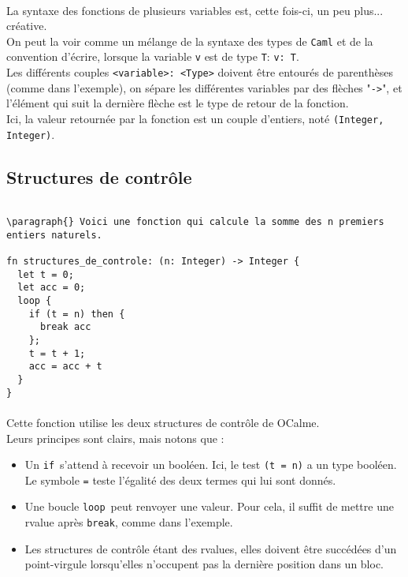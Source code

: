 \documentclass[french]{article}
\begin{document}
\paragraph{} La syntaxe des fonctions de plusieurs variables est,
cette fois-ci, un peu plus... créative. \\
On peut la voir comme un mélange de la syntaxe des types de \verb|Caml|
et de la convention d'écrire, lorsque la variable \verb|v| est de type
\verb|T|: \verb|v: T|. \\
Les différents couples \verb|<variable>: <Type>| doivent être entourés
de parenthèses (comme dans l'exemple), on sépare les différentes variables
par des flèches "\verb|->|", et l'élément qui suit la dernière flèche
est le type de retour de la fonction. \\
Ici, la valeur retournée par la fonction est un couple d'entiers, noté
\verb|(Integer, Integer)|.

\subsection{Structures de contrôle}

\begin{lstlisting}

\paragraph{} Voici une fonction qui calcule la somme des n premiers
entiers naturels.

fn structures_de_controle: (n: Integer) -> Integer {
  let t = 0;
  let acc = 0;
  loop {
    if (t = n) then {
      break acc
    };
    t = t + 1;
    acc = acc + t
  }
}
\end{lstlisting}

\paragraph{} Cette fonction utilise les deux structures de contrôle
de OCalme. \\
Leurs principes sont clairs, mais notons que :
\begin{itemize}
  \item Un \verb|if| s'attend à recevoir un booléen. Ici, le test
  \verb|(t = n)| a un type booléen. Le symbole \verb|=| teste l'égalité
  des deux termes qui lui sont donnés.

  \item Une boucle \verb|loop| peut renvoyer une valeur. Pour cela,
  il suffit de mettre une rvalue après \verb|break|, comme dans l'exemple.

  \item Les structures de contrôle étant des rvalues, elles doivent
  être succédées d'un point-virgule lorsqu'elles n'occupent pas la
  dernière position dans un bloc.
\end{itemize}
\end{document}
